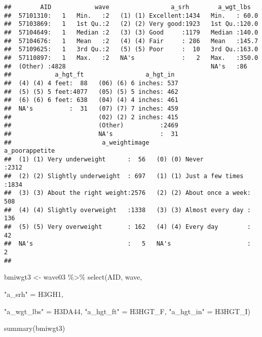 \documentclass[
]{book}
\newenvironment{Shaded}{\begin{snugshade}}{\end{snugshade}}
\newcommand{\FunctionTok}[1]{\textcolor[rgb]{0.00,0.00,0.00}{#1}}
\newcommand{\NormalTok}[1]{#1}
\newcommand{\OtherTok}[1]{\textcolor[rgb]{0.56,0.35,0.01}{#1}}
\newcommand{\SpecialCharTok}[1]{\textcolor[rgb]{0.00,0.00,0.00}{#1}}
\newcommand{\StringTok}[1]{\textcolor[rgb]{0.31,0.60,0.02}{#1}}
\begin{document}
\begin{verbatim}
##        AID            wave                 a_srh        a_wgt_lbs    
##  57101310:   1   Min.   :2   (1) (1) Excellent:1434   Min.   : 60.0  
##  57103869:   1   1st Qu.:2   (2) (2) Very good:1923   1st Qu.:120.0  
##  57104649:   1   Median :2   (3) (3) Good     :1179   Median :140.0  
##  57104676:   1   Mean   :2   (4) (4) Fair     : 286   Mean   :145.7  
##  57109625:   1   3rd Qu.:2   (5) (5) Poor     :  10   3rd Qu.:163.0  
##  57110897:   1   Max.   :2   NA's             :   2   Max.   :350.0  
##  (Other) :4828                                        NA's   :86     
##            a_hgt_ft                 a_hgt_in   
##  (4) (4) 4 feet:  88   (06) (6) 6 inches: 537  
##  (5) (5) 5 feet:4077   (05) (5) 5 inches: 462  
##  (6) (6) 6 feet: 638   (04) (4) 4 inches: 461  
##  NA's          :  31   (07) (7) 7 inches: 459  
##                        (02) (2) 2 inches: 415  
##                        (Other)          :2469  
##                        NA's             :  31  
##                         a_weightimage                    a_poorappetite
##  (1) (1) Very underweight      :  56   (0) (0) Never            :2312  
##  (2) (2) Slightly underweight  : 697   (1) (1) Just a few times :1834  
##  (3) (3) About the right weight:2576   (2) (2) About once a week: 508  
##  (4) (4) Slightly overweight   :1338   (3) (3) Almost every day : 136  
##  (5) (5) Very overweight       : 162   (4) (4) Every day        :  42  
##  NA's                          :   5   NA's                     :   2  
## 
\end{verbatim}

\begin{Shaded}
\begin{Highlighting}[]
\NormalTok{bmiwgt3 }\OtherTok{\textless{}{-}}\NormalTok{ wave03 }\SpecialCharTok{\%\textgreater{}\%}
  \FunctionTok{select}\NormalTok{(AID,}
\NormalTok{         wave,}
         
         \StringTok{"a\_srh"} \OtherTok{=}\NormalTok{ H3GH1,}
         
         \StringTok{"a\_wgt\_lbs"} \OtherTok{=}\NormalTok{ H3DA44,}
         \StringTok{"a\_hgt\_ft"} \OtherTok{=}\NormalTok{ H3HGT\_F,}
         \StringTok{"a\_hgt\_in"} \OtherTok{=}\NormalTok{ H3HGT\_I)}

\FunctionTok{summary}\NormalTok{(bmiwgt3)}
\end{Highlighting}
\end{Shaded}
\end{document}
